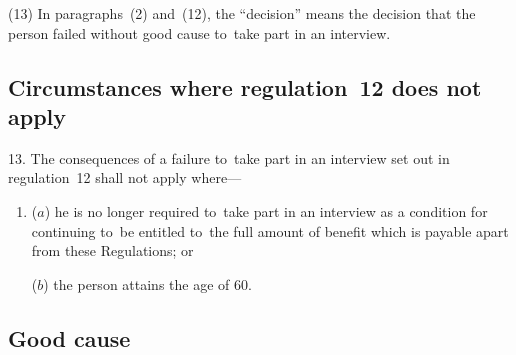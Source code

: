 \documentclass[12pt,a4paper]{article}
\begin{document}
(13) In paragraphs~(2) and~(12), the “decision” means the decision that the person failed without good cause to~take part in an interview.

\subsection[13. Circumstances where regulation~12 does not apply]{Circumstances where regulation~12 does not apply}

13.  The consequences of a failure to~take part in an interview set out in regulation~12 shall not apply where—
\begin{enumerate}\item[]
($a$) he is no longer required to~take part in an interview as a condition for continuing to~be entitled to~the full amount of benefit which is payable apart from these Regulations; or

($b$) the person attains the age of 60.
\end{enumerate}

\subsection[14. Good cause]{Good cause}

\enlargethispage{-\baselineskip}
\end{document}
